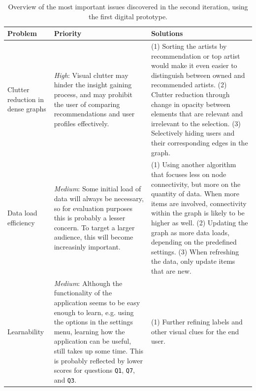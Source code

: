 \begin{table}
	\caption{Overview of the most important issues discovered in the second iteration, using the first digital prototype.}
	\begin{center}
		\begin{tabular}{p{70px} | p{180px} | p{180px} }
			\hline
			\textbf{Problem} & \textbf{Priority} & \textbf{Solutions} \\
			\hline
			
			Clutter reduction in dense graphs
			&
			\emph{High}: Visual clutter may hinder the insight gaining process, and may prohibit the user of comparing recommendations and user profiles effectively.
			&
			(1) Sorting the artists by recommendation or top artist would make it even easier to distinguish between owned and recommended artists. (2) Clutter reduction through change in opacity between elements that are relevant and irrelevant to the selection. (3) Selectively hiding users and their corresponding edges in the graph.
			\\
			
			Data load efficiency
			&
			\emph{Medium}: Some initial load of data will always be necessary, so for evaluation purposes this is probably a lesser concern.  To target a larger audience, this will become increasinly important.
			&
			(1) Using another algorithm that focuses less on node connectivity, but more on the quantity of data. When more items are involved, connectivity within the graph is likely to be higher as well. (2) Updating the graph as more data loads, depending on the predefined settings. (3) When refreshing the data, only update items that are new.
			\\
			
			Learnability
			&
			\emph{Medium}: Although the functionality of the application seems to be easy enough to learn, e.g. using the options in the settings menu, learning how the application can be useful, still takes up some time. This is probably reflected by lower scores for questions \texttt{Q1}, \texttt{Q7}, and \texttt{Q3}.
			&
			(1) Further refining labels and other visual clues for the end user.
			\\
			
			\hline
		\end{tabular}
	\end{center}
\label{table:iteration4:issues}
\end{table}
